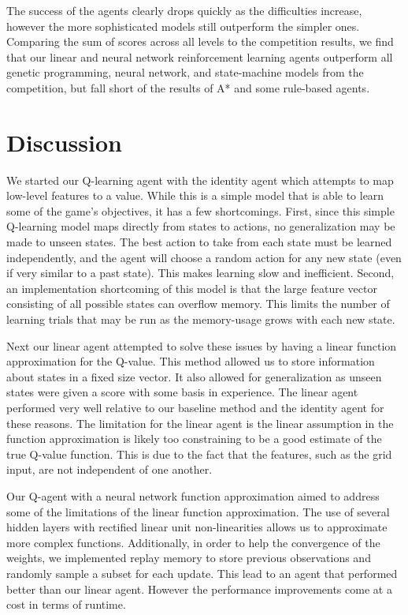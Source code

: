 \documentclass[12pt]{article}
\begin{document}
The success of the agents clearly drops quickly as the difficulties increase, however the more sophisticated models still outperform the simpler ones. Comparing the sum of scores across all levels to the competition results, we find that our linear and neural network reinforcement learning agents outperform all genetic programming, neural network, and state-machine models from the competition, but fall short of the results of A* and some rule-based agents.

\section{Discussion}

We started our Q-learning agent with the identity agent which attempts to map low-level features to a value. While this is a simple model that is able to learn some of the game's objectives, it has a few shortcomings. First, since this simple Q-learning model maps directly from states to actions, no generalization may be made to unseen states. The best action to take from each state must be learned independently, and the agent will choose a random action for any new state (even if very similar to a past state). This makes learning slow and inefficient. Second, an implementation shortcoming of this model is that the large feature vector consisting of all possible states can overflow memory. This limits the number of learning trials that may be run as the memory-usage grows with each new state.

Next our linear agent attempted to solve these issues by having a linear function approximation for the Q-value. This method allowed us to store information about states in a fixed size vector. It also allowed for generalization as unseen states were given a score with some basis in experience. The linear agent performed very well relative to our baseline method and the identity agent for these reasons. The limitation for the linear agent is the linear assumption in the function approximation is likely too constraining to be a good estimate of the true Q-value function. This is due to the fact that the features, such as the grid input, are not independent of one another.

Our Q-agent with a neural network function approximation aimed to address some of the limitations of the linear function approximation. The use of several hidden layers with rectified linear unit non-linearities allows us to approximate more complex functions. Additionally, in order to help the convergence of the weights, we implemented replay memory to store previous observations and randomly sample a subset for each update. This lead to an agent that performed better than our linear agent. However the performance improvements come at a cost in terms of runtime.
\end{document}
